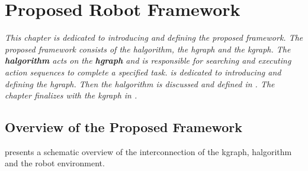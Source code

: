 

\chapter{Proposed Robot Framework}%
\label{chap:hgraph_and_kgraph}
\textit{This chapter is dedicated to introducing and defining the proposed framework. The proposed framework consists of the \acl{halgorithm}, the \acl{hgraph} and the \acl{kgraph}. The \textbf{\acf{halgorithm}} acts on the \textbf{\acf{hgraph}} and is responsible for searching and executing action sequences to complete a specified task.  is dedicated to introducing and defining the \ac{hgraph}. Then the \ac{halgorithm} is discussed and defined in . The chapter finalizes with the \ac{kgraph} in .\bs}

\section{Overview of the Proposed Framework}
 presents a schematic overview of the interconnection of the \ac{kgraph}, \ac{halgorithm} and the robot environment.\bs

